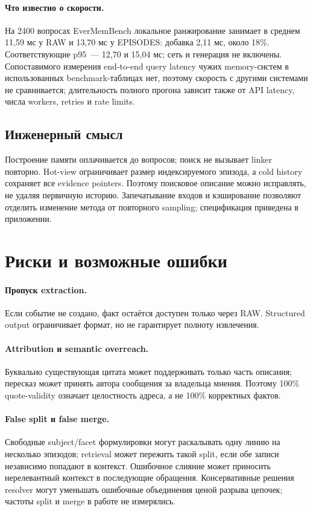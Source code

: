 \documentclass[11pt,a4paper]{article}
\newcommand{\raw}{RAW}
\begin{document}
\paragraph{Что известно о скорости.}
На 2400 вопросах EverMemBench локальное ранжирование занимает в среднем
11{,}59 мс у RAW и 13{,}70 мс у EPISODES: добавка 2{,}11 мс, около 18\%.
Соответствующие p95~--- 12{,}70 и 15{,}04 мс; сеть и генерация не включены.
Сопоставимого измерения end-to-end query latency чужих memory-систем в
использованных benchmark-таблицах нет, поэтому скорость с другими системами не
сравнивается; длительность полного прогона зависит также от API latency, числа
workers, retries и rate limits.

\subsection{Инженерный смысл}
Построение памяти оплачивается до вопросов; поиск не вызывает linker
повторно. Hot-view ограничивает размер индексируемого эпизода, а cold history
сохраняет все evidence pointers. Поэтому поисковое описание можно исправлять,
не удаляя первичную историю. Запечатывание входов и кэширование позволяют
отделить изменение метода от повторного sampling; спецификация приведена в
приложении.

\section{Риски и возможные ошибки}
\label{sec:errors}

\paragraph{Пропуск extraction.}
Если событие не создано, факт остаётся доступен только через \raw{}.
Structured output ограничивает формат, но не гарантирует полноту извлечения.

\paragraph{Attribution и semantic overreach.}
Буквально существующая цитата может поддерживать только часть описания;
пересказ может принять автора сообщения за владельца мнения. Поэтому 100\%
quote-validity означает целостность адреса, а не 100\% корректных фактов.

\paragraph{False split и false merge.}
Свободные subject/facet формулировки могут раскалывать одну линию на несколько
эпизодов; retrieval может пережить такой split, если обе записи независимо
попадают в контекст. Ошибочное слияние может приносить нерелевантный контекст в
последующие обращения. Консервативные решения resolver могут уменьшать
ошибочные объединения ценой разрыва цепочек; частоты split и merge в работе не
измерялись.
\end{document}
